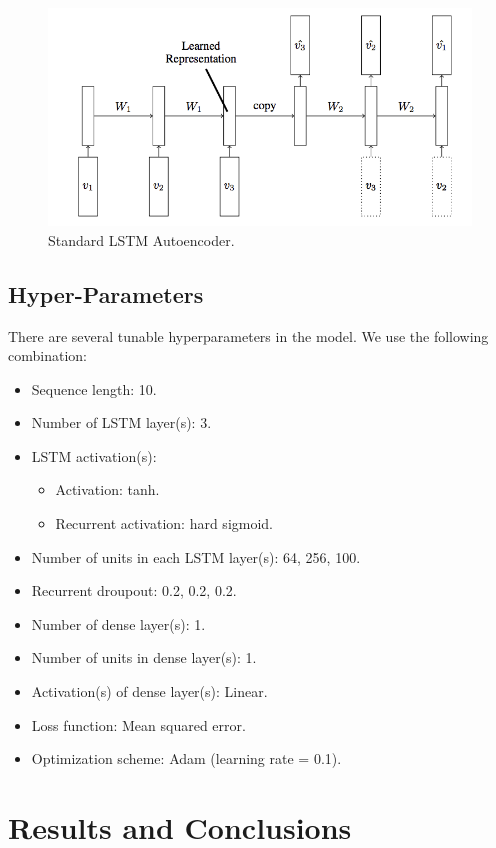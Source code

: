 \documentclass[%
aip,
amsmath,amssymb,
reprint,%
]{revtex4-1}
\begin{document}
\begin{figure}[h!]
	\includegraphics[width=\linewidth]{LSTM-Autoencoder-Model.png}
	\caption{Standard LSTM Autoencoder.}
	\label{fig:lstm_autoenc}
\end{figure}

\subsection{Hyper-Parameters}

There are several tunable hyperparameters in the model. We use the following combination:

\begin{itemize}
  \item Sequence length: 10.
  \item Number of LSTM layer(s): 3.
  \item LSTM activation(s):
  \begin{itemize}
      \item Activation: tanh.
      \item Recurrent activation: hard sigmoid.
  \end{itemize}
  \item Number of units in each LSTM layer(s): 64, 256, 100.
  \item Recurrent droupout: 0.2, 0.2, 0.2.
  \item Number of dense layer(s): 1.
  \item Number of units in dense layer(s): 1.
  \item Activation(s) of dense layer(s): Linear.
  \item Loss function: Mean squared error.
  \item Optimization scheme: Adam (learning rate = 0.1).
\end{itemize}

\section{Results and Conclusions}
\end{document}

